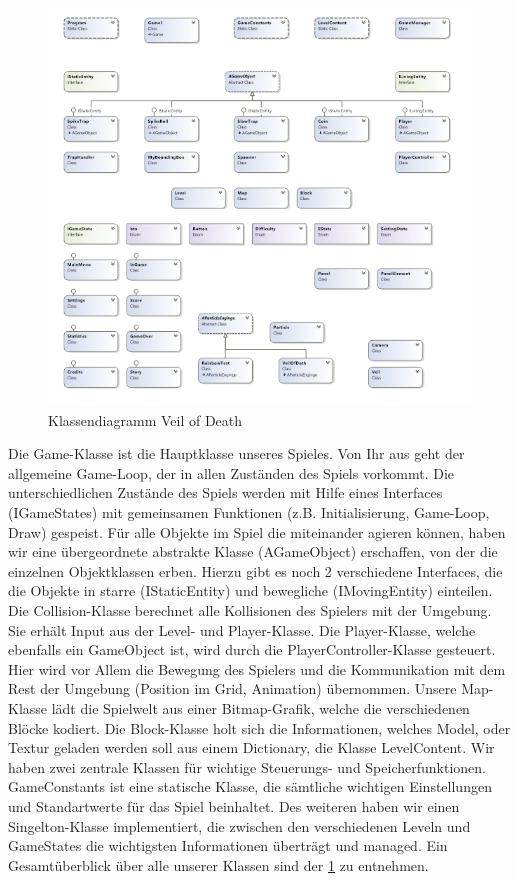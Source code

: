 \documentclass[12pt]{article}
\begin{document}
\begin{figure}
	\centering
	\includegraphics[width=1\textwidth]{classdiagramm.png}
	\caption{Klassendiagramm Veil of Death
		\label{fig:classdiagramm}}
\end{figure}

Die Game-Klasse ist die Hauptklasse unseres Spieles. Von Ihr aus geht der allgemeine Game-Loop, der in allen Zuständen des Spiels vorkommt. Die
unterschiedlichen Zustände des Spiels werden mit Hilfe eines Interfaces (IGameStates) mit gemeinsamen Funktionen (z.B. Initialisierung, Game-Loop, Draw) gespeist.
Für alle Objekte im Spiel die miteinander agieren können, haben wir eine übergeordnete abstrakte Klasse (AGameObject) erschaffen, von der die einzelnen Objektklassen erben.
Hierzu gibt es noch 2 verschiedene Interfaces, die die Objekte in starre (IStaticEntity) und bewegliche (IMovingEntity) einteilen.
Die Collision-Klasse berechnet alle Kollisionen des Spielers mit der Umgebung. Sie erhält Input
aus der Level- und Player-Klasse.
Die Player-Klasse, welche ebenfalls ein GameObject ist, wird durch die PlayerController-Klasse
gesteuert. Hier wird vor Allem die Bewegung des Spielers und die Kommunikation mit dem Rest der Umgebung (Position im Grid, Animation) übernommen.
Unsere Map-Klasse lädt die Spielwelt aus einer Bitmap-Grafik, welche die verschiedenen Blöcke kodiert.
Die Block-Klasse holt sich die Informationen, welches Model, oder Textur geladen werden soll aus einem Dictionary, die Klasse LevelContent.
Wir haben zwei zentrale Klassen für wichtige Steuerungs- und Speicherfunktionen. GameConstants ist eine statische Klasse, die sämtliche wichtigen
Einstellungen und Standartwerte für das Spiel beinhaltet. Des weiteren haben wir einen Singelton-Klasse implementiert, die zwischen den verschiedenen
Leveln und GameStates die wichtigsten Informationen überträgt und managed.
Ein Gesamtüberblick über alle unserer Klassen sind der \ref{fig:classdiagramm} zu entnehmen.
\end{document}
